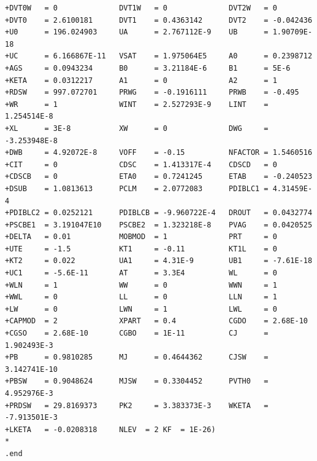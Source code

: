 \documentclass[12pt]{article}
\begin{document}
\begin{lstlisting}
+DVT0W   = 0              DVT1W   = 0              DVT2W   = 0
+DVT0    = 2.6100181      DVT1    = 0.4363142      DVT2    = -0.042436
+U0      = 196.024903     UA      = 2.767112E-9    UB      = 1.90709E-18
+UC      = 6.166867E-11   VSAT    = 1.975064E5     A0      = 0.2398712
+AGS     = 0.0943234      B0      = 3.21184E-6     B1      = 5E-6
+KETA    = 0.0312217      A1      = 0              A2      = 1
+RDSW    = 997.072701     PRWG    = -0.1916111     PRWB    = -0.495
+WR      = 1              WINT    = 2.527293E-9    LINT    = 1.254514E-8
+XL      = 3E-8           XW      = 0              DWG     = -3.253948E-8
+DWB     = 4.92072E-8     VOFF    = -0.15          NFACTOR = 1.5460516
+CIT     = 0              CDSC    = 1.413317E-4    CDSCD   = 0
+CDSCB   = 0              ETA0    = 0.7241245      ETAB    = -0.240523
+DSUB    = 1.0813613      PCLM    = 2.0772083      PDIBLC1 = 4.31459E-4
+PDIBLC2 = 0.0252121      PDIBLCB = -9.960722E-4   DROUT   = 0.0432774
+PSCBE1  = 3.191047E10    PSCBE2  = 1.323218E-8    PVAG    = 0.0420525
+DELTA   = 0.01           MOBMOD  = 1              PRT     = 0
+UTE     = -1.5           KT1     = -0.11          KT1L    = 0
+KT2     = 0.022          UA1     = 4.31E-9        UB1     = -7.61E-18
+UC1     = -5.6E-11       AT      = 3.3E4          WL      = 0
+WLN     = 1              WW      = 0              WWN     = 1
+WWL     = 0              LL      = 0              LLN     = 1
+LW      = 0              LWN     = 1              LWL     = 0
+CAPMOD  = 2              XPART   = 0.4            CGDO    = 2.68E-10
+CGSO    = 2.68E-10       CGBO    = 1E-11          CJ      = 1.902493E-3
+PB      = 0.9810285      MJ      = 0.4644362      CJSW    = 3.142741E-10
+PBSW    = 0.9048624      MJSW    = 0.3304452      PVTH0   = 4.952976E-3
+PRDSW   = 29.8169373     PK2     = 3.383373E-3    WKETA   = -7.913501E-3
+LKETA   = -0.0208318     NLEV	= 2	KF	= 1E-26)
*
.end
\end{lstlisting}
\end{document}
